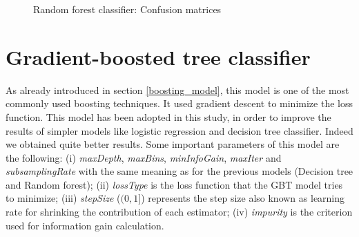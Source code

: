 \documentclass[LaM,binding=0.6cm, english]{sapthesis}
\begin{document}
\begin{figure}[!ht]
  \centering
  \hfill
  \caption{Random forest classifier: Confusion matrices}
\end{figure}


\section{Gradient-boosted tree classifier}

As already introduced in section \ref{boosting_model}, this model is one of the most commonly used boosting techniques. It used gradient descent to minimize the loss function. This model has been adopted in this study, in order to improve the results of simpler models like logistic regression and decision tree classifier. Indeed we obtained quite better results. Some important parameters of this model are the following: (i) \textit{maxDepth}, \textit{maxBins}, \textit{minInfoGain}, \textit{maxIter} and \textit{subsamplingRate} with the same meaning as for the previous models (Decision tree and Random forest); (ii) \textit{lossType} is the loss function that the GBT model tries to minimize; (iii) \textit{stepSize} ($(0, 1]$) represents the step size also known as learning rate for shrinking the contribution of each estimator; (iv) \textit{impurity} is the criterion used for information gain calculation.\cite{pysparkGBT}
\end{document}
